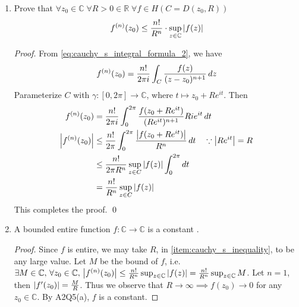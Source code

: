 \documentclass[notoc,notitlepage]{tufte-book}
\begin{document}
\begin{ex}\label{ex:applications_of_cauchy_s_integral_formula}
	\begin{enumerate}
		\item {} Prove that $\forall z_0 \in \mathbb{C} \; \forall R > 0 \in \mathbb{R} \; \forall f \in H(C = D(z_0, R))$ \label{item:cauchy_s_inequality}
			\begin{equation*}
				f^{(n)}(z_0) \leq \frac{n!}{R^n} \cdot \sup_{z \in \mathbb{C}} \left|f(z)\right|
			\end{equation*}

			\begin{proof}
				From \cref{eq:cauchy_s_integral_formula_2}, we have
				\begin{equation*}
					f^{(n)}(z_0) = \frac{n!}{2 \pi i} \int_{C} \frac{f(z)}{(z - z_0)^{n + 1}} \mathop{}\!d{z} 
				\end{equation*}
				Parameterize $C$ with $\gamma: [0, 2 \pi] \to \mathbb{C}$, where $t \mapsto z_0 + Re^{it}$. Then
				\begin{align*}
					f^{(n)} (z_0) &= \frac{n!}{2 \pi i} \int_{0}^{2 \pi} \frac{f(z_0 + Re^{it})}{(Re^{it})^{n + 1}} Rie^{it} \mathop{}\!d{t} \\
					\left|f^{(n)}(z_0)\right| &\leq \frac{n!}{2 \pi} \int_{0}^{2 \pi} \frac{\left|f(z_0 + Re^{it})\right|}{R^n} \mathop{}\!d{t} \quad \because \left|Re^{it}\right| = R \\
						&\leq \frac{n!}{2 \pi R^n} \sup_{z \in C} \left|f(z)\right| \int_{0}^{2\pi} \mathop{}\!d{t} \\
						&= \frac{n!}{R^n} \sup_{z \in C} \left|f(z)\right|
				\end{align*}
				This completes the proof. \qed
			\end{proof}

		\item {} A bounded entire function $f: \mathbb{C} \to \mathbb{C}$ is a constant .\label{item:liouville_s_theorem}

			\begin{proof}
				Since $f$ is entire, we may take $R$, in \cref{item:cauchy_s_inequality}, to be any large value. Let $M$ be the bound of $f$, i.e. $\exists M \in \mathbb{C}, \, \forall z_0 \in \mathbb{C}, \, \left|f^{(n)}(z_0)\right| \leq \frac{n!}{R^n} \sup_{z \in \mathbb{C}} \left|f(z)\right| = \frac{n!}{R^n} \sup_{z \in \mathbb{C}} M$. Let $n = 1$, then $\left|f'(z_0)\right| = \frac{M}{R}$. Thus we observe that $R \to \infty \implies f(z_0) \to 0$ for any $z_0 \in \mathbb{C}$. By A2Q5(a), $f$ is a constant.
			\end{proof}


\end{enumerate}
\end{ex}
\end{document}
